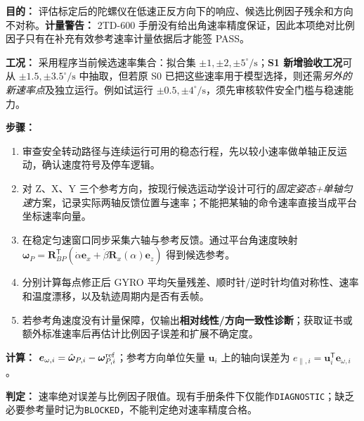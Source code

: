 \textbf{目的：} 评估标定后的陀螺仪在低速正反方向下的响应、候选比例因子残余和方向不对称。\textbf{计量警告：} 2TD-600 手册没有给出角速率精度保证，因此本项绝对比例因子只有在补充有效参考速率计量依据后才能签 PASS。
\par\textbf{工况：} 采用程序当前候选速率集合：拟合集 $\pm1,\pm2,\pm5^\circ/\mathrm s$；\textbf{S1 新增验收工况}可从 $\pm1.5,\pm3.5^\circ/\mathrm s$ 中抽取，但若原 S0 已把这些速率用于模型选择，则还需\emph{另外的新速率点}及独立运行。例如试运行 $\pm0.5,\pm4^\circ/\mathrm s$，须先审核软件安全门槛与稳速能力。
\par\textbf{步骤：}
\begin{enumerate}
\item 审查安全转动路径与连续运行可用的稳态行程，先以较小速率做单轴正反运动，确认速度符号及停车逻辑。
\item 对 Z、X、Y 三个参考方向，按现行候选运动学设计可行的\emph{固定姿态+单轴匀速}方案，记录实际两轴反馈位置与速率；不能把某轴的命令速率直接当成平台坐标速率向量。
\item 在稳定匀速窗口同步采集六轴与参考反馈。通过平台角速度映射 $\bm\omega_P=\bm R_{BP}^{\mathsf T}(\dot\alpha\bm e_x+\dot\beta\bm R_x(\alpha)\bm e_z)$ 得到候选参考。
\item 分别计算每点修正后 GYRO 平均矢量残差、顺时针/逆时针均值对称性、速率和温度漂移，以及轨迹周期内是否有丢帧。
\item 若参考角速度没有计量保障，仅输出\textbf{相对线性/方向一致性诊断}；获取证书或额外标准速率后再估计比例因子误差和扩展不确定度。
\end{enumerate}
\textbf{计算：} $\bm e_{\omega,i}=\hat{\bm\omega}_{P,i}-\bm\omega_{P,i}^{\rm ref}$；参考方向单位矢量 $\bm u_i$ 上的轴向误差为 $e_{\parallel,i}=\bm u_i^{\mathsf T}\bm e_{\omega,i}$。
\par\textbf{判定：} 速率绝对误差与比例因子限值\pending。现有手册条件下仅能作\texttt{DIAGNOSTIC}；缺乏必要参考量时记为\texttt{BLOCKED}，不能判定绝对速率精度合格。

